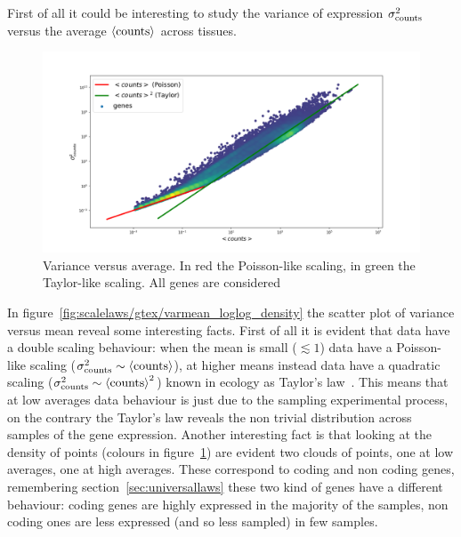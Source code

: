 First of all it could be interesting to study the variance of expression $\sigma^2_{\mathrm{counts}}$ versus 
the average $\left\langle \mathrm{counts}\right\rangle$ across tissues.
\begin{figure}[htb!]
    \centering
    \includegraphics[width=0.9\linewidth]{pictures/scalelaws/gtex/allgenes/varmean_loglog.png}
    \caption{Variance versus average. In red the Poisson-like scaling, in green the Taylor-like scaling. All genes are considered}
    \label{fig:scalelaws/gtex/allgenes/varmean_loglog_density}
\end{figure}
In figure~\ref{fig:scalelaws/gtex/varmean_loglog_density} the scatter plot of variance versus mean reveal some interesting facts.
First of all it is evident that data have a double scaling behaviour: when the mean is small ($\lesssim 1$) data have a Poisson-like scaling ($\sigma^2_{\mathrm{counts}} \sim \left\langle \mathrm{counts}\right\rangle$), at higher means instead data have a quadratic scaling ($\sigma^2_{\mathrm{counts}} \sim \left\langle \mathrm{counts}\right\rangle^2$) known in ecology as Taylor's law~\cite{Eisler2008}. This means that at low averages data behaviour is just due to the sampling experimental process, on the contrary the Taylor's law reveals the non trivial distribution across samples of the gene expression.
Another interesting fact is that looking at the density of points (colours in figure~\ref{fig:scalelaws/gtex/allgenes/varmean_loglog_density}) are evident two clouds of points, one at low averages, one at high averages. These correspond to coding and non coding genes, remembering section~\ref{sec:universallaws} these two kind of genes have a different behaviour: coding genes are highly expressed in the majority of the samples, non coding ones are less expressed (and so less sampled) in few samples. 

